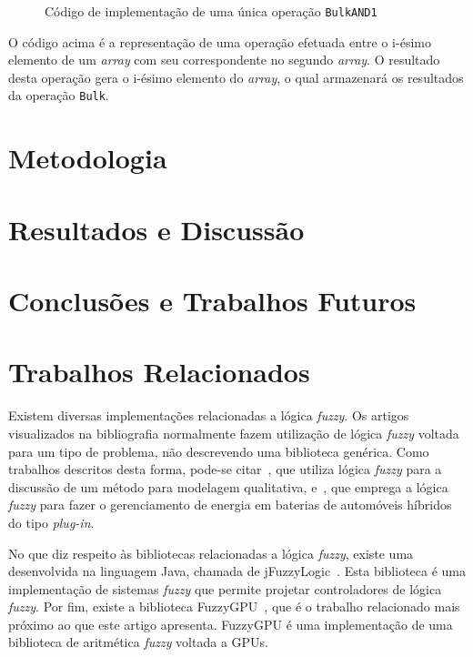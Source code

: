 \documentclass[12pt]{article}
\begin{document}
\begin{figure}[!h]
\centering

\caption{Código de implementação de uma única operação \texttt{BulkAND1}}
\label{fig:bulkoperation}
\end{figure}

O código acima é a representação de uma operação efetuada entre o i-ésimo elemento de um \textit{array} com seu correspondente no segundo \textit{array}. O resultado desta operação gera o i-ésimo elemento do \textit{array}, o qual armazenará os resultados da operação \texttt{Bulk}.

\section{Metodologia}
\label{sec:metodologia}	

\section{Resultados e Discussão}	
\label{sec:resultados}	

\section{Conclusões e Trabalhos Futuros}
\label{sec:conclusoes}	
	
\section{Trabalhos Relacionados}
\label{sec:trabalhos}

	Existem diversas implementações relacionadas a lógica \textit{fuzzy}. Os artigos visualizados na bibliografia normalmente fazem utilização de lógica \textit{fuzzy} voltada para um tipo de problema, não descrevendo uma biblioteca genérica. Como trabalhos descritos desta forma, pode-se citar~\cite{sugeno:93}, que utiliza lógica \textit{fuzzy} para a discussão de um método para modelagem qualitativa, e~\cite{li:11}, que emprega a lógica \textit{fuzzy} para fazer o gerenciamento de energia em baterias de automóveis híbridos do tipo \textit{plug-in}.
	
	No que diz respeito às bibliotecas relacionadas a lógica \textit{fuzzy}, existe uma desenvolvida na linguagem Java, chamada de jFuzzyLogic~\cite{cingolani:12, cingolani:13}. Esta biblioteca é uma implementação de sistemas \textit{fuzzy} que permite projetar controladores de lógica \textit{fuzzy}. Por fim, existe a biblioteca FuzzyGPU~\cite{defour:14}, que é o trabalho relacionado mais próximo ao que este artigo apresenta. FuzzyGPU é uma implementação de uma biblioteca de aritmética \textit{fuzzy} voltada a GPUs.
	
 	


\end{document}
